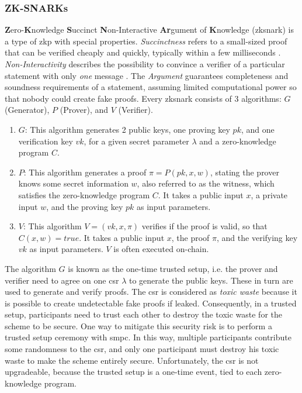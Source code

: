 \subsubsection{ZK-SNARKs}
\label{subsubsec:zksnarks}

\textbf{Z}ero-\textbf{K}nowledge \textbf{S}uccinct \textbf{N}on-Interactive \textbf{Ar}gument of \textbf{K}nowledge (\acrshort{zksnark}) is a type of \acrshort{zkp} with special properties. \emph{Succinctness} refers to a small-sized proof that can be verified cheaply and quickly, typically within a few milliseconds \cite{simunicVerifiableComputingApplications2021}. \emph{Non-Interactivity} describes the possibility to convince a verifier of a particular statement with only \emph{one} message \cite{eberhardtOffchainingModelsApproaches2018,eberhardtZoKratesScalablePrivacyPreserving2018a,simunicVerifiableComputingApplications2021}. The \emph{Argument} guarantees completeness and soundness requirements of a statement, assuming limited computational power so that nobody could create fake proofs. Every \acrshort{zksnark} consists of 3 algorithms: $G$ (Generator), $P$ (Prover), and $V$ (Verifier).

\begin{enumerate}
    \item $G$: This algorithm generates 2 public keys, one proving key $pk$, and one verification key $vk$, for a given secret parameter $\lambda$ and a zero-knowledge program $C$.
    \item $P$: This algorithm generates a proof $\pi = P(pk, x, w)$, stating the prover knows some secret information $w$, also referred to as the witness, which satisfies the zero-knowledge program $C$. It takes a public input $x$, a private input $w$, and the proving key $pk$ as input parameters.
    \item $V$: This algorithm $V = (vk, x, \pi)$ verifies if the proof is valid, so that $C(x, w) = true$. It takes a public input $x$, the proof $\pi$, and the verifying key $vk$ as input parameters. $V$ is often executed on-chain.
\end{enumerate}

The algorithm $G$ is known as the one-time trusted setup, i.e. the prover and verifier need to agree on one \acrfull{csr} $\lambda$ to generate the public keys. These in turn are used to generate and verify proofs. The \acrshort{csr} is considered as \emph{toxic waste} because it is possible to create undetectable fake proofs if leaked. Consequently, in a trusted setup, participants need to trust each other to destroy the toxic waste for the scheme to be secure. One way to mitigate this security risk is to perform a trusted setup ceremony with \acrfull{smpc}. In this way, multiple participants contribute some randomness to the \acrshort{csr}, and only one participant must destroy his toxic waste to make the scheme entirely secure. Unfortunately, the \acrshort{csr} is not upgradeable, because the trusted setup is a one-time event, tied to each zero-knowledge program.

